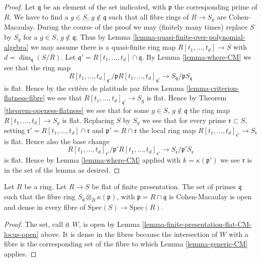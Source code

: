 \begin{proof}
Let $\mathfrak q$ be an element of the set indicated, with
$\mathfrak p$ the corresponding prime of $R$.
We have to find a $g \in S$, $g \not \in \mathfrak q$ such that
all fibre rings of $R \to S_g$ are Cohen-Macaulay.
During the course of the proof we may (finitely many times)
replace $S$ by $S_g$ for a $g \in S$, $g \not \in \mathfrak q$.
Thus by Lemma \ref{lemma-quasi-finite-over-polynomial-algebra}
we may assume there is a quasi-finite ring map
$R[t_1, \ldots, t_d] \to S$ with $d = \dim_{\mathfrak q}(S/R)$.
Let $\mathfrak q' = R[t_1, \ldots, t_d] \cap \mathfrak q$.
By Lemma \ref{lemma-where-CM} we see that the ring map
$$
R[t_1, \ldots, t_d]_{\mathfrak q'} /
\mathfrak p R[t_1, \ldots, t_d]_{\mathfrak q'}
\longrightarrow
S_{\mathfrak q}/\mathfrak p S_{\mathfrak q}
$$
is flat. Hence by the crit\`ere de platitude par fibres
Lemma \ref{lemma-criterion-flatness-fibre} we see that
$R[t_1, \ldots, t_d]_{\mathfrak q'} \to S_{\mathfrak q}$ is flat.
Hence by Theorem \ref{theorem-openess-flatness} we see that
for some $g \in S$, $g \not \in \mathfrak q$ the ring map
$R[t_1, \ldots, t_d] \to S_g$ is flat. Replacing $S$ by $S_g$
we see that for every prime $\mathfrak r \subset S$,
setting $\mathfrak r' = R[t_1, \ldots, t_d] \cap \mathfrak r$
and $\mathfrak p' = R \cap \mathfrak r$
the local ring map
$R[t_1, \ldots, t_d]_{\mathfrak r'} \to S_{\mathfrak r}$ is flat.
Hence also the base change
$$
R[t_1, \ldots, t_d]_{\mathfrak r'} /
\mathfrak p' R[t_1, \ldots, t_d]_{\mathfrak r'}
\longrightarrow
S_{\mathfrak r}/\mathfrak p' S_{\mathfrak r}
$$
is flat. Hence by Lemma \ref{lemma-where-CM} applied with
$k = \kappa(\mathfrak p')$ we see
$\mathfrak r$ is in the set of the lemma
as desired.
\end{proof}

\begin{lemma}
\label{lemma-generic-CM-flat-finite-presentation}
Let $R$ be a ring. Let $R \to S$ be flat of finite presentation.
The set of primes $\mathfrak q$ such that the fibre ring
$S_{\mathfrak q} \otimes_R \kappa(\mathfrak p)$,
with $\mathfrak p = R \cap \mathfrak q$ is Cohen-Macaulay
is open and dense in every fibre of $\text{Spec}(S) \to \text{Spec}(R)$.
\end{lemma}

\begin{proof}
The set, call it $W$, is open by
Lemma \ref{lemma-finite-presentation-flat-CM-locus-open} above.
It is dense in the fibres because the intersection of $W$
with a fibre is the corresponding set of the fibre
to which Lemma \ref{lemma-generic-CM} applies.
\end{proof}

